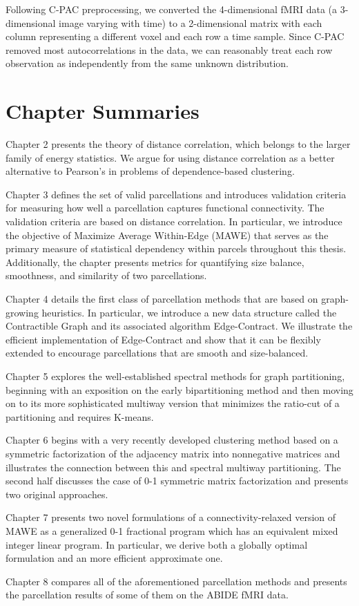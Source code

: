 Following C-PAC preprocessing, we converted the 4-dimensional fMRI data
(a 3-dimensional image varying with time) to a 2-dimensional matrix
with each column representing a different voxel and each row a time
sample. Since C-PAC removed most autocorrelations in the data, we can
reasonably treat each row observation as independently from the same
unknown distribution.

\section{Chapter Summaries}
Chapter 2 presents the theory of distance correlation, which
belongs to the larger family of energy statistics. We argue for using
distance correlation as a better alternative to Pearson's in problems
of dependence-based clustering.

Chapter 3 defines the set of valid parcellations and introduces
validation criteria for measuring how well a parcellation captures
functional connectivity. The validation criteria are based on distance
correlation. In particular, we introduce the objective of Maximize
Average Within-Edge (MAWE) that serves as the primary measure of
statistical dependency within parcels throughout this thesis.
Additionally, the chapter presents metrics for quantifying size balance, 
smoothness, and similarity of two parcellations.

Chapter 4 details the first class of parcellation methods that are
based on graph-growing heuristics. In particular, we introduce a new
data structure called the Contractible Graph and its associated
algorithm Edge-Contract. We illustrate the efficient implementation of
Edge-Contract and show that it can be flexibly extended to encourage
parcellations that are smooth and size-balanced.

Chapter 5 explores the well-established spectral methods for graph
partitioning, beginning with an exposition on the early bipartitioning
method and then moving on to its more sophisticated multiway version
that minimizes the ratio-cut of a partitioning and requires K-means.

Chapter 6 begins with a very recently developed clustering method based
on a symmetric factorization of the adjacency matrix into nonnegative
matrices and illustrates the connection between this and spectral
multiway partitioning. The second half discusses the case of 0-1
symmetric matrix factorization and presents two original approaches.

Chapter 7 presents two novel formulations of a connectivity-relaxed
version of MAWE as a generalized 0-1 fractional program which has an
equivalent mixed integer linear program. In particular, we derive both a
globally optimal formulation and an more efficient approximate one.

Chapter 8 compares all of the aforementioned parcellation methods and
presents the parcellation results of some of them on the ABIDE fMRI data.
